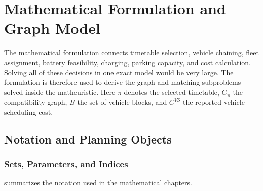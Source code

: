 \chapter{Mathematical Formulation and Graph Model}
\label{chap:model}
\label{chap:formulation}

The mathematical formulation connects timetable selection, vehicle chaining,
fleet assignment, battery feasibility, charging, parking capacity, and cost
calculation. Solving all of these decisions in one exact model would be very
large. The formulation is therefore used to derive the graph and matching
subproblems solved inside the matheuristic. Here \(\pi\) denotes the selected
timetable, \(G_\pi\) the compatibility graph, \(B\) the set of vehicle blocks,
and \(C^{VS}\) the reported vehicle-scheduling cost.

\section{Notation and Planning Objects}

\subsection{Sets, Parameters, and Indices}

 summarizes the notation used in the mathematical chapters.

